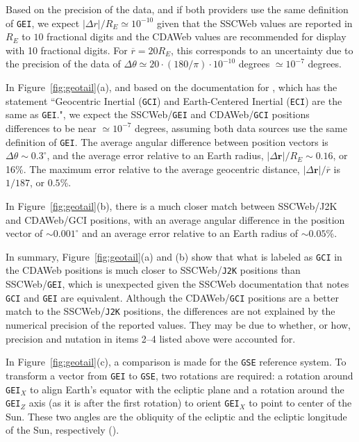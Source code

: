 \documentclass[draft]{agujournal2019}
\begin{document}
Based on the precision of the data, and if both providers use the same definition of \texttt{GEI}, we expect $|\Delta r|/R_E \simeq 10^{-10}$ given that the SSCWeb values are reported in $R_E$ to $10$ fractional digits and the CDAWeb values are recommended for display with 10 fractional digits. For $\overline{r}=20 R_E$, this corresponds to an uncertainty due to the precision of the data of $\Delta \theta \simeq 20\cdot (180/\pi) \cdot 10^{-10}$ degrees $\simeq 10^{-7}$ degrees.

In Figure~\ref{fig:geotail}(a), and based on the documentation for , which has the statement ``Geocentric Inertial (\texttt{GCI}) and Earth-Centered Inertial (\texttt{ECI}) are the same as \texttt{GEI}.", we expect the SSCWeb/\texttt{GEI} and CDAWeb/\texttt{GCI} positions differences to be near $\simeq 10^{-7}$ degrees, assuming both data sources use the same definition of \texttt{GEI}. The average angular difference between position vectors is $\Delta \theta \sim 0.3^\circ$, and the average error relative to an Earth radius, $|\Delta\mathbf{r}|/R_E\sim 0.16$, or 16\%. The maximum error relative to the average geocentric distance, $|\Delta \mathbf{r}|/\overline{r}$ is $1/187$, or $0.5$\%.

In Figure~\ref{fig:geotail}(b), there is a much closer match between SSCWeb/J2K and CDAWeb/GCI positions, with an average angular difference in the position vector of ${\sim}0.001^\circ$ and an average error relative to an Earth radius of ${\sim}0.05$\%. 

In summary, Figure~\ref{fig:geotail}(a) and (b) show that what is labeled as \texttt{GCI} in the CDAWeb positions is much closer to SSCWeb/\texttt{J2K} positions than SSCWeb/\texttt{GEI}, which is unexpected given the SSCWeb documentation that notes \texttt{GCI} and \texttt{GEI} are equivalent. Although the CDAWeb/\texttt{GCI} positions are a better match to the SSCWeb/\texttt{J2K} positions, the differences are not explained by the numerical precision of the reported values. They may be due to whether, or how, precision and nutation in items 2--4 listed above were accounted for.

In Figure~\ref{fig:geotail}(c), a comparison is made for the \texttt{GSE} reference system. To transform a vector from \texttt{GEI} to \texttt{GSE}, two rotations are required: a rotation around \texttt{GEI}$_X$ to align Earth's equator with the ecliptic plane and a rotation around the \texttt{GEI}$_Z$ axis (as it is after the first rotation) to orient \texttt{GEI}$_X$ to point to center of the Sun. These two angles are the obliquity of the ecliptic and the ecliptic longitude of the Sun, respectively ().
\end{document}
